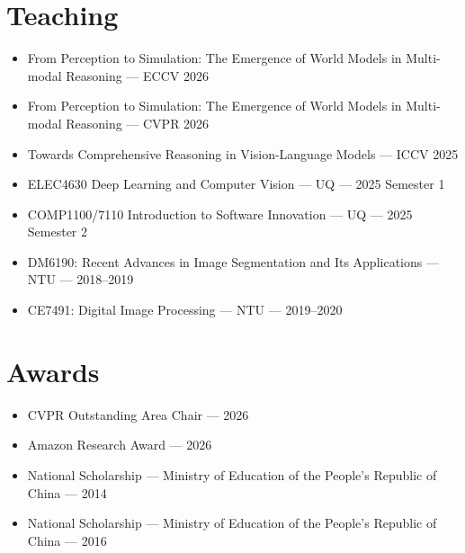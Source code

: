 \section*{Teaching}
\begin{itemize}
\item From Perception to Simulation: The Emergence of World Models in Multi-modal Reasoning — ECCV 2026
\item From Perception to Simulation: The Emergence of World Models in Multi-modal Reasoning — CVPR 2026
\item Towards Comprehensive Reasoning in Vision-Language Models — ICCV 2025
\item ELEC4630 Deep Learning and Computer Vision — UQ — 2025 Semester 1
\item COMP1100/7110 Introduction to Software Innovation — UQ — 2025 Semester 2
\item DM6190: Recent Advances in Image Segmentation and Its Applications — NTU — 2018–2019
\item CE7491: Digital Image Processing — NTU — 2019–2020
\end{itemize}
\section*{Awards}
\begin{itemize}
\item CVPR Outstanding Area Chair — 2026
\item Amazon Research Award — 2026
\item National Scholarship — Ministry of Education of the People’s Republic of China — 2014
\item National Scholarship — Ministry of Education of the People’s Republic of China — 2016
\end{itemize}
